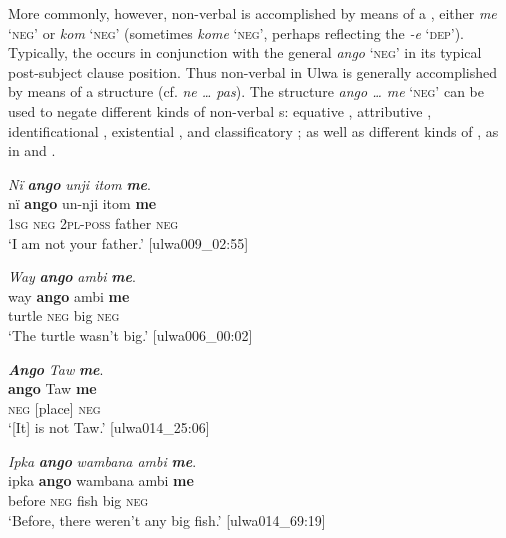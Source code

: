 More commonly, however, non-verbal  is accomplished by means of a , either \textit{me} ‘\textsc{neg’} or \textit{kom} ‘\textsc{neg’} (sometimes \textit{kome} ‘\textsc{neg}’, perhaps reflecting the  \textit{-e} ‘\textsc{dep}’). Typically, the  occurs in conjunction with the general  \textit{ango} ‘\textsc{neg’} in its typical post-subject clause position. Thus non-verbal  in Ulwa is generally accomplished by means of a  structure (cf.  \textit{ne … pas}). The  structure \textit{ango … me} ‘\textsc{neg}’ can be used to negate different kinds of  non-verbal s:  equative ,  attributive ,  identificational ,  existential , and  classificatory ; as well as different kinds of , as in  and .

\ea%
    \label{ex:syntax:140}
          \textit{Nï} \textbf{\textit{ango}} \textit{unji itom} \textbf{\textit{me}}.\\
\gll nï    \textbf{ango}  un-nji    itom  \textbf{me}\\
    1\textsc{sg}  \textsc{neg}  \textsc{2pl-poss}  father   \textsc{neg}\\
\glt    ‘I am not your father.’ [ulwa009\_02:55]
\z

\ea%
    \label{ex:syntax:141}
          \textit{Way} \textbf{\textit{ango}} \textit{ambi} \textbf{\textit{me}}.\\
\gll way  \textbf{ango}  ambi  \textbf{me}\\
    turtle  \textsc{neg}  big  \textsc{neg}\\
\glt `The turtle wasn’t big.’ [ulwa006\_00:02]
\z

\ea%
    \label{ex:syntax:142}
          \textbf{\textit{Ango}} \textit{Taw} \textbf{\textit{me}}.\\
\gll \textbf{ango}  Taw  \textbf{me}\\
    \textsc{neg}  [place]  \textsc{neg}\\
\glt `[It] is not Taw.’ [ulwa014\_25:06]
\z

\ea%
    \label{ex:syntax:143}
          \textit{Ipka} \textbf{\textit{ango}} \textit{wambana ambi} \textbf{\textit{me}}.\\
\gll ipka  \textbf{ango}  wambana  ambi  \textbf{me}\\
    before  \textsc{neg}  fish    big    \textsc{neg}\\
\glt `Before, there weren’t any big fish.’ [ulwa014\_69:19]
\z

